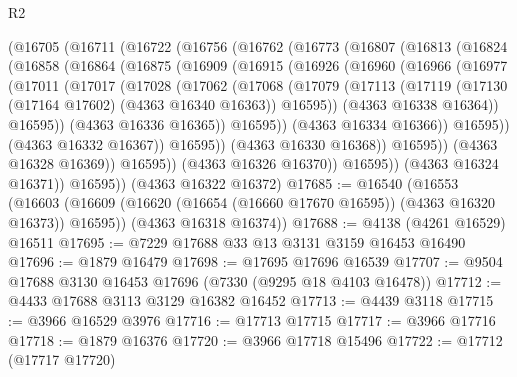 \begin{lexlean}{R2}
\begin{coremodule}
    (@16705
      (@16711
        (@16722
          (@16756
            (@16762
              (@16773
                (@16807
                  (@16813
                    (@16824
                      (@16858
                        (@16864
                          (@16875
                            (@16909
                              (@16915
                                (@16926
                                  (@16960
                                    (@16966
                                      (@16977
                                        (@17011
                                          (@17017
                                            (@17028
                                              (@17062
                                                (@17068
                                                  (@17079
                                                    (@17113
                                                      (@17119
                                                        (@17130
                                                          (@17164 @17602)
                                                          (@4363 @16340 @16363))
                                                        @16595))
                                                    (@4363 @16338 @16364))
                                                  @16595))
                                              (@4363 @16336 @16365))
                                            @16595))
                                        (@4363 @16334 @16366))
                                      @16595))
                                  (@4363 @16332 @16367))
                                @16595))
                            (@4363 @16330 @16368))
                          @16595))
                      (@4363 @16328 @16369))
                    @16595))
                (@4363 @16326 @16370))
              @16595))
          (@4363 @16324 @16371))
        @16595))
    (@4363 @16322 @16372)
@17685 := @16540
    (@16553
      (@16603 (@16609 (@16620 (@16654 (@16660 @17670 @16595)) (@4363 @16320 @16373)) @16595))
      (@4363 @16318 @16374))
@17688 := @4138 (@4261 @16529) @16511
@17695 := @7229 @17688 @33 @13 @3131 @3159 @16453 @16490
@17696 := @1879 @16479
@17698 := @17695 @17696 @16539
@17707 := @9504 @17688 @3130 @16453 @17696 (@7330 (@9295 @18 @4103 @16478))
@17712 := @4433 @17688 @3113 @3129 @16382 @16452
@17713 := @4439 @3118
@17715 := @3966 @16529 @3976
@17716 := @17713 @17715
@17717 := @3966 @17716
@17718 := @1879 @16376
@17720 := @3966 @17718 @15496
@17722 := @17712 (@17717 @17720)

\end{coremodule}
\end{lexlean}
